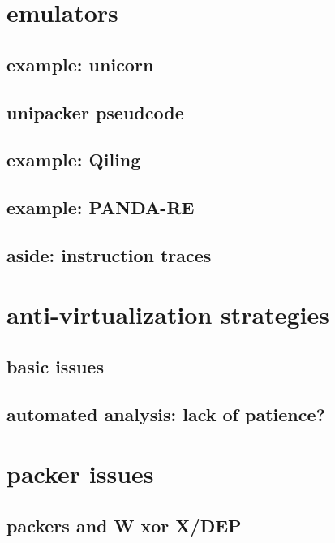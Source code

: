 \section{emulators}
\subsection{example: unicorn}


\subsection{unipacker pseudcode}


\subsection{example: Qiling}

\subsection{example: PANDA-RE}


\subsection{aside: instruction traces}


\section{anti-virtualization strategies}
\subsection{basic issues}


\subsection{automated analysis: lack of patience?}


\section{packer issues}
\subsection{packers and W xor X/DEP}


